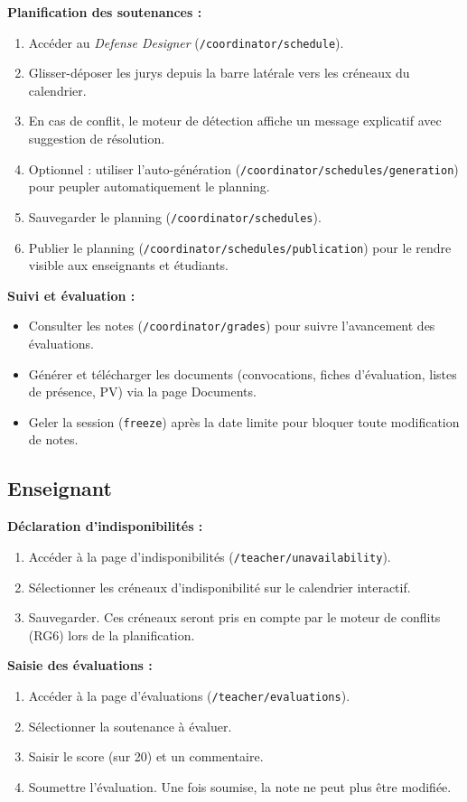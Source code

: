 \textbf{Planification des soutenances :}
\begin{enumerate}
    \item Accéder au \textit{Defense Designer} (\texttt{/coordinator/schedule}).
    \item Glisser-déposer les jurys depuis la barre latérale vers les créneaux du calendrier.
    \item En cas de conflit, le moteur de détection affiche un message explicatif avec suggestion de résolution.
    \item Optionnel : utiliser l'auto-génération (\texttt{/coordinator/schedules/generation}) pour peupler automatiquement le planning.
    \item Sauvegarder le planning (\texttt{/coordinator/schedules}).
    \item Publier le planning (\texttt{/coordinator/schedules/publication}) pour le rendre visible aux enseignants et étudiants.
\end{enumerate}

\textbf{Suivi et évaluation :}
\begin{itemize}
    \item Consulter les notes (\texttt{/coordinator/grades}) pour suivre l'avancement des évaluations.
    \item Générer et télécharger les documents (convocations, fiches d'évaluation, listes de présence, PV) via la page Documents.
    \item Geler la session (\texttt{freeze}) après la date limite pour bloquer toute modification de notes.
\end{itemize}

\subsection{Enseignant}

\textbf{Déclaration d'indisponibilités :}
\begin{enumerate}
    \item Accéder à la page d'indisponibilités (\texttt{/teacher/unavailability}).
    \item Sélectionner les créneaux d'indisponibilité sur le calendrier interactif.
    \item Sauvegarder. Ces créneaux seront pris en compte par le moteur de conflits (RG6) lors de la planification.
\end{enumerate}

\textbf{Saisie des évaluations :}
\begin{enumerate}
    \item Accéder à la page d'évaluations (\texttt{/teacher/evaluations}).
    \item Sélectionner la soutenance à évaluer.
    \item Saisir le score (sur 20) et un commentaire.
    \item Soumettre l'évaluation. Une fois soumise, la note ne peut plus être modifiée.
\end{enumerate}

